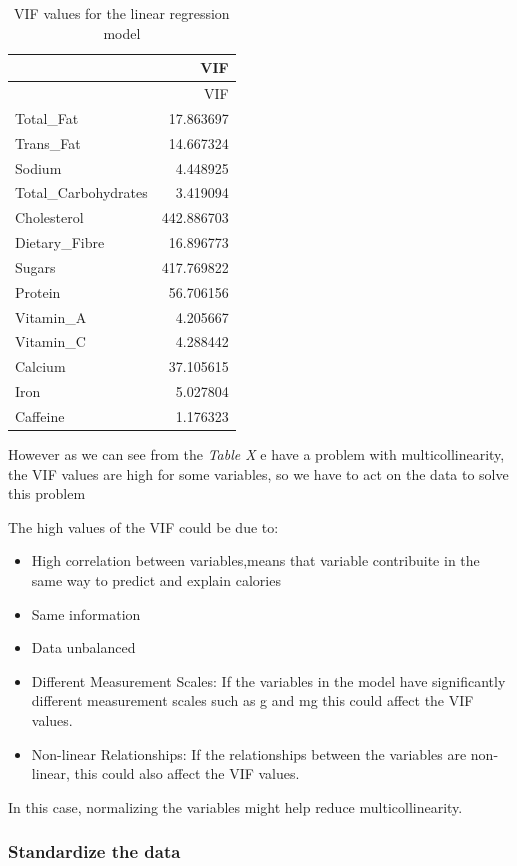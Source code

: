 \documentclass[
]{article}
\begin{document}
\begin{longtable}[]{@{}lr@{}}
\caption{VIF values for the linear regression model}\tabularnewline
\toprule\noalign{}
& VIF \\
\midrule\noalign{}
\endfirsthead
\toprule\noalign{}
& VIF \\
\midrule\noalign{}
\endhead
\bottomrule\noalign{}
\endlastfoot
Total\_Fat & 17.863697 \\
Trans\_Fat & 14.667324 \\
Sodium & 4.448925 \\
Total\_Carbohydrates & 3.419094 \\
Cholesterol & 442.886703 \\
Dietary\_Fibre & 16.896773 \\
Sugars & 417.769822 \\
Protein & 56.706156 \\
Vitamin\_A & 4.205667 \\
Vitamin\_C & 4.288442 \\
Calcium & 37.105615 \\
Iron & 5.027804 \\
Caffeine & 1.176323 \\
\end{longtable}

However as we can see from the \emph{Table X} e have a problem with
multicollinearity, the VIF values are high for some variables, so we
have to act on the data to solve this problem

The high values of the VIF could be due to:

\begin{itemize}
\item
  High correlation between variables,means that variable contribuite in
  the same way to predict and explain calories
\item
  Same information
\item
  Data unbalanced
\item
  Different Measurement Scales: If the variables in the model have
  significantly different measurement scales such as g and mg this could
  affect the VIF values.
\item
  Non-linear Relationships: If the relationships between the variables
  are non-linear, this could also affect the VIF values.
\end{itemize}

In this case, normalizing the variables might help reduce
multicollinearity.

\hypertarget{standardize-the-data}{%
\subsubsection{Standardize the data}\label{standardize-the-data}}
\end{document}
